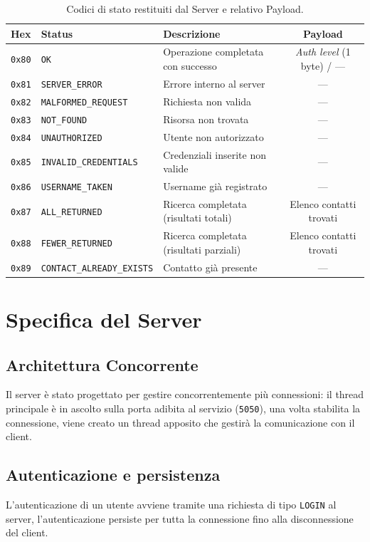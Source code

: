 \documentclass[11pt, a4paper]{article}
\begin{document}
	\begin{table}[H] %
	\centering
		\begin{tabular}{lllc}
			\toprule
			\textbf{Hex} & \textbf{Status} & \textbf{Descrizione} & \textbf{Payload} \\
			\midrule
			\texttt{0x80} & \texttt{OK} & Operazione completata con successo & \textit{Auth level} (1 byte) / --- \\
			\texttt{0x81} & \texttt{SERVER\_ERROR} & Errore interno al server & --- \\
			\texttt{0x82} & \texttt{MALFORMED\_REQUEST} & Richiesta non valida & --- \\
			\texttt{0x83} & \texttt{NOT\_FOUND} & Risorsa non trovata & --- \\
			\texttt{0x84} & \texttt{UNAUTHORIZED} & Utente non autorizzato & --- \\
			\texttt{0x85} & \texttt{INVALID\_CREDENTIALS} & Credenziali inserite non valide & --- \\
			\texttt{0x86} & \texttt{USERNAME\_TAKEN} & Username già registrato & --- \\
			\texttt{0x87} & \texttt{ALL\_RETURNED} & Ricerca completata (risultati totali) & Elenco contatti trovati \\
			\texttt{0x88} & \texttt{FEWER\_RETURNED} & Ricerca completata (risultati parziali) & Elenco contatti trovati \\
			\texttt{0x89} & \texttt{CONTACT\_ALREADY\_EXISTS} & Contatto già presente & --- \\
			\bottomrule
		\end{tabular}
	\caption{Codici di stato restituiti dal Server e relativo Payload.}
	\end{table}
	
	\section{Specifica del Server}
	\subsection{Architettura Concorrente}
	Il server è stato progettato per gestire concorrentemente più connessioni: il thread principale è in ascolto sulla porta adibita al servizio (\texttt{5050}), una volta stabilita la connessione, viene creato un thread apposito che gestirà la comunicazione con il client.
	
	\subsection{Autenticazione e persistenza}
	L'autenticazione di un utente avviene tramite una richiesta di tipo \texttt{LOGIN} al server, l'autenticazione persiste per tutta la connessione fino alla disconnessione del client.
	
\end{document}
